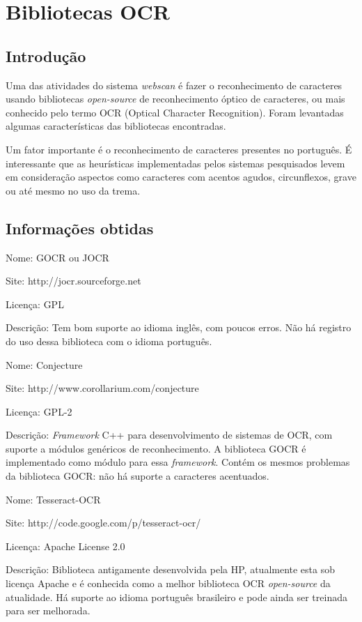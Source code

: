 \section{Bibliotecas OCR}
\label{sec:pesquisa_ocr}

\subsection{Introdução}
Uma das atividades do sistema {\it webscan} é fazer o reconhecimento de caracteres usando bibliotecas {\it open-source} de reconhecimento óptico de caracteres, ou mais conhecido pelo termo OCR (Optical Character Recognition). Foram levantadas algumas características das bibliotecas encontradas.

Um fator importante é o reconhecimento de caracteres presentes no português. É interessante que as heurísticas implementadas pelos sistemas pesquisados levem em consideração aspectos como caracteres com acentos agudos, circunflexos, grave ou até mesmo no uso da trema.

\subsection{Informações obtidas}
\label{sec:libs_ocr}

\begin{description*}
    \item[Nome:] GOCR ou JOCR
    \item[Site:] http://jocr.sourceforge.net
    \item[Licença:] GPL
    \item[Descrição:] Tem bom suporte ao idioma inglês, com poucos erros. Não há registro do uso dessa biblioteca com o idioma português.
\end{description*}

\begin{description*}
    \item[Nome:] Conjecture
    \item[Site:] http://www.corollarium.com/conjecture
    \item[Licença:] GPL-2
    \item[Descrição:] {\it Framework} C++ para desenvolvimento de sistemas de OCR, com suporte a módulos genéricos de reconhecimento. A biblioteca GOCR é implementado como módulo para essa {\it framework}. Contém os mesmos problemas da biblioteca GOCR: não há suporte a caracteres acentuados.
\end{description*}

\begin{description*}
    \item[Nome:] Tesseract-OCR
    \item[Site:] http://code.google.com/p/tesseract-ocr/
    \item[Licença:] Apache License 2.0
    \item[Descrição:] Biblioteca antigamente desenvolvida pela HP, atualmente esta sob licença Apache e é conhecida como a melhor biblioteca OCR {\it open-source} da atualidade. Há suporte ao idioma português brasileiro e pode ainda ser treinada para ser melhorada.
\end{description*}



